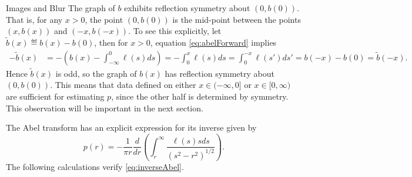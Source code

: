 \begin{chapter}{Images and Blur}
  The graph of $b$ exhibits reflection symmetry about $(0,b(0))$.
  That is, for any $x>0$, the point $(0,b(0))$ is the mid-point between the points $(x,b(x))$ and $(-x,b(-x))$. 
  To see this explicitly, let $\tilde b(x) \eqdef b(x) - b(0)$, then for $x>0$, equation \eqref{eq:abelForward} implies
  \begin{align}
    -\tilde b(x) &= -\left(b(x) - \int_{-\infty}^0 \ell(s)ds\right) = -\int_0^x \ell(s)ds = \int_0^{-x}\ell(s')ds' = b(-x) - b(0) = \tilde b(-x).
  \end{align}
  Hence $\tilde b(x)$ is odd, so the graph of $b(x)$ has reflection symmetry about $(0,b(0))$.
  This means that data defined on either $x\in(-\infty,0]$ or $x\in[0,\infty)$ are sufficient for estimating $p$, since the other half is determined by symmetry.
  This observation will be important in the next section.

  The Abel transform has an explicit expression for its inverse \citep{epstein2008} given by
  \begin{equation} \label{eq:inverseAbel}
    p(r) = -\frac{1}{\pi r} \frac{d}{dr}\left(\int_r^\infty \frac{\ell(s) s ds}{ (s^2 - r^2)^{1/2} } \right).  
  \end{equation} 
  The following calculations verify \eqref{eq:inverseAbel}.


\end{chapter}
